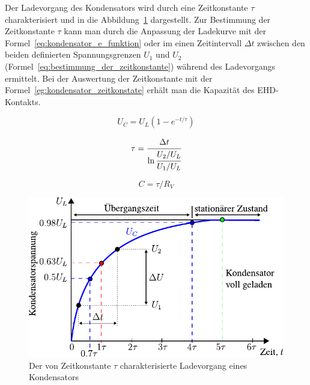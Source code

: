 Der Ladevorgang des Kondensators wird durch eine Zeitkonstante $\tau$ charakterisiert und in die Abbildung~\ref{fig:ladevorgang_eines_kondensators} dargestellt.
Zur Bestimmung der Zeitkonstante $\tau$ kann man durch die Anpassung der Ladekurve mit der Formel~\ref{eq:kondensator_e_funktion} oder im einen Zeitintervall $\Delta t$ zwischen den beiden definierten Spannungsgrenzen $U_1$ und $U_2$ (Formel~\ref{eq:bestimmung_der_zeitkonstante}) während des Ladevorgangs ermittelt.
Bei der Auswertung der Zeitkonstante mit der Formel~\ref{eg:kondensator_zeitkonstate} erhält man die Kapazität des EHD-Kontakts.

\begin{minipage}[b]{0.3\textwidth}
    \begin{equation}
        U_C = U_L (1 - e ^ {-t/\tau})
        \label{eq:kondensator_e_funktion}
    \end{equation}
\end{minipage}
%
\begin{minipage}[b]{0.3\textwidth}
    \begin{equation}
        \tau = \cfrac{\Delta t}{\ln \cfrac{U_2 / U_L}{U_1 / U_L}}
        \label{eq:bestimmung_der_zeitkonstante}
    \end{equation}
\end{minipage}
%
\begin{minipage}[b]{0.3\textwidth}
    \begin{equation}
        C = \tau / R_V
        \label{eg:kondensator_zeitkonstate}
    \end{equation}
\end{minipage}

\begin{figure}[htb]
    \centering
    \includegraphics[]{./images/kondensator_ladevorgang.pdf}
    \caption{Der von Zeitkonstante $\tau$ charakterisierte Ladevorgang eines Kondensators}
    \label{fig:ladevorgang_eines_kondensators}
\end{figure}


